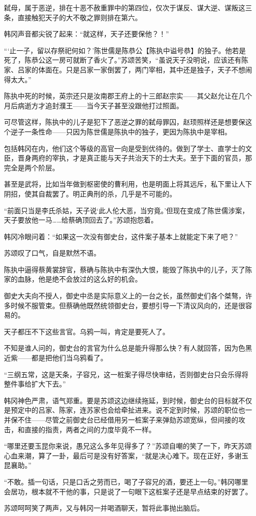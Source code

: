 弑母，属于恶逆，排在十恶不赦重罪中的第四位，仅次于谋反、谋大逆、谋叛这三条，直接触犯天子的大不敬之罪则排在第六。

韩冈声音都尖锐了起来：“就这样，天子还要保他？！”

“‘止一子，留以存祭祀何如？’陈世儒是陈恭公【陈执中谥号恭】的独子。他若是死了，陈恭公这一房可就断了香火了。”苏颂苦笑，“虽说天子没明说，应该还有陈家、吕家的体面在。只是吕家一家倒罢了，两门宰相，其中还是独子，天子不想闹得太大。”

陈执中死的时候，英宗还只是汝南郡王府上的十三郎赵宗实——其父赵允让在几个月后病逝方才追封濮王——当今天子甚至没跟他打过照面。

可尽管这样，陈执中的儿子是犯下了恶逆之罪的弑母罪囚，赵顼照样还是想要保这个逆子一条性命——只因为陈世儒是陈执中的独子，更因为陈执中是宰相。

包括韩冈在内，他们这个等级的高官一向是受到优待的。做到了学士、直学士的文臣，晋身两府的宰执，才是真正能与天子共治天下的士大夫。至于下面的官员，那完全是两个阶层。

甚至是武将，比如当年做到枢密使的曹利用，也是明面上将其远斥，私下里让人下阴招，使其自裁罢了。明正典刑的杀，几乎是不可能的。

“前面只当是李氏杀姑，天子说‘此人伦大恶，当穷竟。’但现在变成了陈世儒涉案，天子要放他一马……给蔡确顶回去了。”苏颂抱怨着。

韩冈冷眼问着：“如果这一次没有御史台，这件案子基本上就能定下来了吧？”

苏颂叹了口气，自是默然不语。

陈执中逼得蔡黄裳辞官，蔡确与陈执中有深仇大恨，能毁了陈执中的儿子，灭了陈家的血脉，他是绝不会放过的这么好的机会。

御史大夫向不授人，御史中丞是实际意义上的一台之长，虽然御史们各个桀骜，许多时候不服管束。但蔡确他既然统领御史台，要想引导一下清议风向的，还是很容易的。

天子都压不下这些言官。乌鸦一叫，肯定是要死人了。

不知是谁人问的，御史台的言官为什么总是能升得那么快？有人就回答，因为色黑近紫——都是把他们当乌鸦看了。

“三纲五常，这是天条，子容兄，这一桩案子得尽快审结，否则御史台只会乐得将整件事给扩大下去。”

韩冈神色严肃，语气郑重。要是苏颂这边继续拖延，到时候，御史台的目标就不仅是预定中的吕家、陈家，连苏家也会给牵扯进来。说不定到时候，苏颂的职位也一并保不住——尽管之前御史台已经借用另一桩案子来弹劾苏颂宽纵，但间接的攻击，和直接的指责，两者之间的力度毕竟不一样。

“哪里还要玉昆你来说，愚兄这么多年见得多了？”苏颂自嘲的笑了一下，昨天苏颂心血来潮，算了一卦，最后可是没有好答案，“就是决心难下。现在正好，多谢玉昆襄助。”

“不敢。插一句话，只是口舌之劳而已，喝了子容兄的酒，要还上一句。”韩冈哪里会居功，根本就不干他的事，只是说了一句眼下这桩案子还是早点结束的好罢了。

苏颂呵呵笑了两声，又与韩冈一并喝酒聊天，暂将此事抛出脑后。

